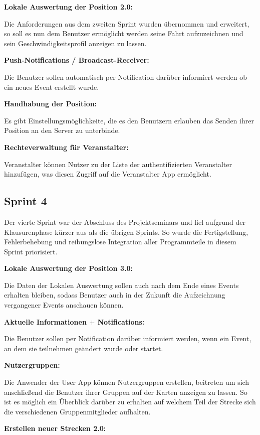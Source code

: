 \documentclass[a4paper, titlepage]{scrartcl}
\begin{document}
\textbf{Lokale Auswertung der Position 2.0:}

Die Anforderungen aus dem zweiten Sprint wurden übernommen und erweitert, so soll es nun dem Benutzer ermöglicht werden seine Fahrt aufzuzeichnen und sein Geschwindigkeitsprofil anzeigen zu lassen.

\textbf{Push-Notifications / Broadcast-Receiver:}

Die Benutzer sollen automatisch per Notification darüber informiert werden ob ein neues Event erstellt wurde.

\textbf{Handhabung der Position:}

Es gibt Einstellungsmöglichkeite, die es den Benutzern erlauben das Senden ihrer Position an den Server zu unterbinde.

\textbf{Rechteverwaltung für Veranstalter:}

Veranstalter können Nutzer zu der Liste der authentifizierten Veranstalter hinzufügen, was diesen Zugriff auf die Veranstalter App ermöglicht.



\subsection{Sprint 4}
Der vierte Sprint war der Abschluss des Projektseminars und fiel aufgrund der Klausurenphase kürzer aus als die übrigen Sprints. So wurde die Fertigstellung, Fehlerbehebung und reibungslose Integration aller Programmteile in diesem Sprint priorisiert.

\textbf{Lokale Auswertung der Position 3.0:}

Die Daten der Lokalen Auswertung sollen auch nach dem Ende eines Events erhalten bleiben, sodass Benutzer auch in der Zukunft die Aufzeichnung vergangener Events anschauen können.

\textbf{Aktuelle Informationen $+$ Notifications:}

Die Benutzer sollen per Notification darüber informiert werden, wenn ein Event, an dem sie teilnehmen geändert wurde oder startet.

\textbf{Nutzergruppen:}

Die Anwender der User App können Nutzergruppen erstellen, beitreten um sich anschließend die Benutzer ihrer Gruppen auf der Karten anzeigen zu lassen. So ist es möglich ein Überblick darüber zu erhalten auf welchem Teil der Strecke sich die verschiedenen Gruppenmitglieder aufhalten. 

\textbf{Erstellen neuer Strecken 2.0:}
\end{document}

